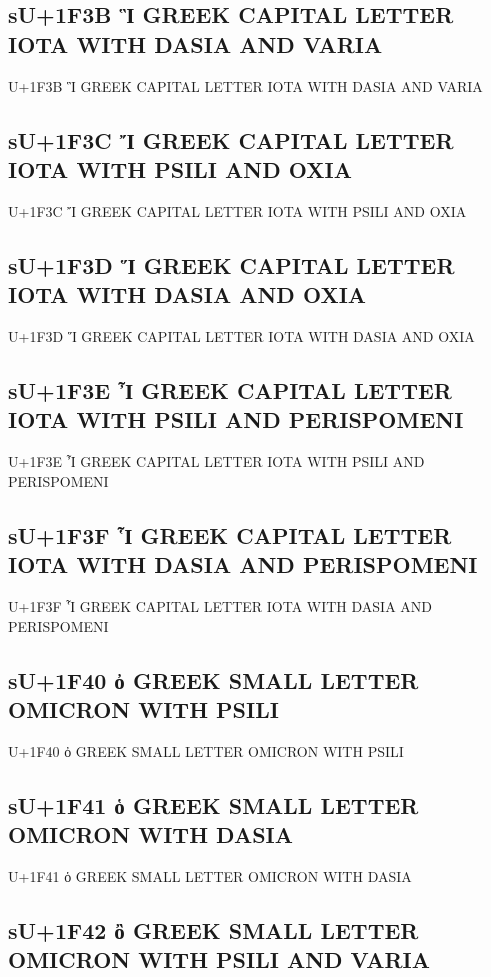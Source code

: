 \subsection{sU+1F3B Ἳ GREEK CAPITAL LETTER IOTA WITH DASIA AND VARIA}

U+1F3B Ἳ GREEK CAPITAL LETTER IOTA WITH DASIA AND VARIA

\subsection{sU+1F3C Ἴ GREEK CAPITAL LETTER IOTA WITH PSILI AND OXIA}

U+1F3C Ἴ GREEK CAPITAL LETTER IOTA WITH PSILI AND OXIA

\subsection{sU+1F3D Ἵ GREEK CAPITAL LETTER IOTA WITH DASIA AND OXIA}

U+1F3D Ἵ GREEK CAPITAL LETTER IOTA WITH DASIA AND OXIA

\subsection{sU+1F3E Ἶ GREEK CAPITAL LETTER IOTA WITH PSILI AND PERISPOMENI}

U+1F3E Ἶ GREEK CAPITAL LETTER IOTA WITH PSILI AND PERISPOMENI

\subsection{sU+1F3F Ἷ GREEK CAPITAL LETTER IOTA WITH DASIA AND PERISPOMENI}

U+1F3F Ἷ GREEK CAPITAL LETTER IOTA WITH DASIA AND PERISPOMENI

\subsection{sU+1F40 ὀ GREEK SMALL LETTER OMICRON WITH PSILI}

U+1F40 ὀ GREEK SMALL LETTER OMICRON WITH PSILI

\subsection{sU+1F41 ὁ GREEK SMALL LETTER OMICRON WITH DASIA}

U+1F41 ὁ GREEK SMALL LETTER OMICRON WITH DASIA

\subsection{sU+1F42 ὂ GREEK SMALL LETTER OMICRON WITH PSILI AND VARIA}

